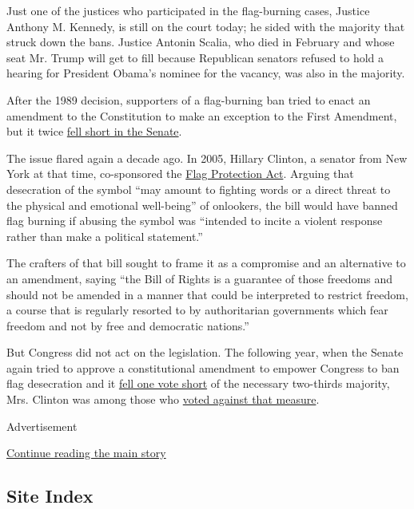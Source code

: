 Just one of the justices who participated in the flag-burning cases,
Justice Anthony M. Kennedy, is still on the court today; he sided with
the majority that struck down the bans. Justice Antonin Scalia, who died
in February and whose seat Mr. Trump will get to fill because Republican
senators refused to hold a hearing for President Obama's nominee for the
vacancy, was also in the majority.

After the 1989 decision, supporters of a flag-burning ban tried to enact
an amendment to the Constitution to make an exception to the First
Amendment, but it twice
\href{http://www.nytimes3xbfgragh.onion/1989/10/20/us/senate-rejects-amendment-outlawing-flag-desecration.html}{fell
short in the Senate}.

The issue flared again a decade ago. In 2005, Hillary Clinton, a senator
from New York at that time, co-sponsored the
\href{https://www.congress.gov/bill/109th-congress/senate-bill/1911/cosponsors}{Flag
Protection Act}. Arguing that desecration of the symbol ``may amount to
fighting words or a direct threat to the physical and emotional
well-being'' of onlookers, the bill would have banned flag burning if
abusing the symbol was ``intended to incite a violent response rather
than make a political statement.''

The crafters of that bill sought to frame it as a compromise and an
alternative to an amendment, saying ``the Bill of Rights is a guarantee
of those freedoms and should not be amended in a manner that could be
interpreted to restrict freedom, a course that is regularly resorted to
by authoritarian governments which fear freedom and not by free and
democratic nations.''

But Congress did not act on the legislation. The following year, when
the Senate again tried to approve a constitutional amendment to empower
Congress to ban flag desecration and it
\href{http://www.nytimes3xbfgragh.onion/2006/06/27/washington/27cnd-flag.html}{fell
one vote short} of the necessary two-thirds majority, Mrs. Clinton was
among those who
\href{http://www.nytimes3xbfgragh.onion/2006/06/28/washington/28hillary.html}{voted
against that measure}.

Advertisement

\protect\hyperlink{after-bottom}{Continue reading the main story}

\hypertarget{site-index}{%
\subsection{Site Index}\label{site-index}}

